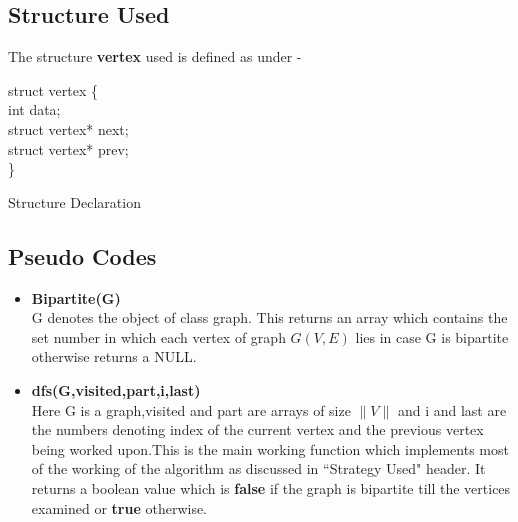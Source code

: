 \documentclass[20pt]{article}
\begin{document}
\newcommand\mycommfont[1]{\small\ttfamily\textcolor{blue}{#1}}

\subsection{Structure Used}

The structure \textbf{vertex} used is defined as under -
\begin{algorithm}

	struct vertex \{ \\
		\hspace{1cm} int data; \\
		\hspace{1cm} struct vertex* next; \\
		\hspace{1cm} struct vertex* prev; \\
	\}

	\caption{Structure Declaration}

\end{algorithm}

\subsection{Pseudo Codes}

\begin{itemize}
\item \textbf{Bipartite(G)} \\
G denotes the object of class graph. This returns an array which contains the set number in which each vertex of graph $G(V,E)$ lies in case G is bipartite otherwise returns a NULL.
\item \textbf{dfs(G,visited,part,i,last)} \\
Here G is a graph,visited and part are arrays of size $\|V\|$ and i and last are the numbers denoting index of the current vertex and the previous vertex being worked upon.This is the main working function which implements most of the working of the algorithm as discussed in ``Strategy Used" header. It returns a boolean value which is \textbf{false} if the graph is bipartite till the vertices examined or \textbf{true} otherwise.
\end{itemize}
\end{document}
